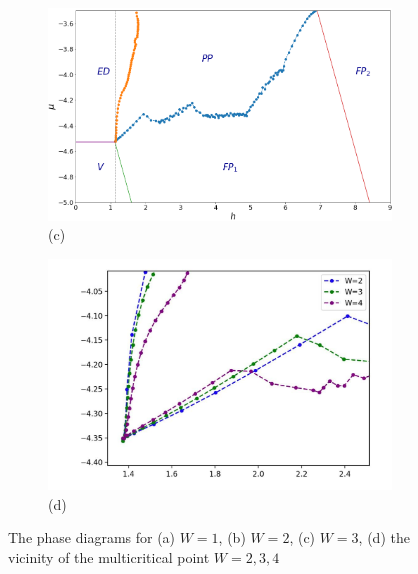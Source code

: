 \documentclass[a0,portrait]{a0poster}
\begin{document}
\begin{multicols}{2}
\begin{figure}[H]
    \centering
    \begin{subfigure}[t]{0.23\textwidth}
        \centering
        \includegraphics[width=\linewidth]{w=3.png}
        \caption*{(c)}
    \end{subfigure}
    \hfill
    \begin{subfigure}[t]{0.23\textwidth}
        \centering
        \includegraphics[width=\linewidth]{copm234.jpg}
        \caption*{(d)}
     \end{subfigure}
     \caption{The phase diagrams for  (a) $W = 1$, (b) $W = 2$, (c) $W = 3$, (d) the vicinity of the multicritical point $W = 2, 3, 4$}
\label{pol}
\end{figure}



\end{multicols}
\end{document}
